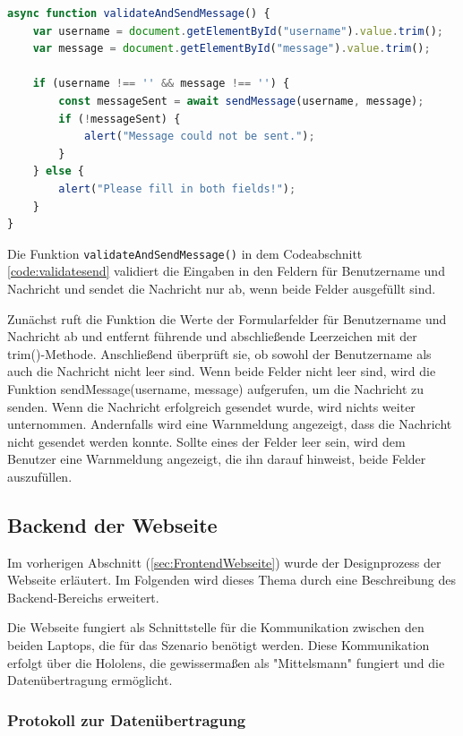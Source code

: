 \begin{itemize}
\begin{lstlisting}[language=JavaScript, caption={Javascript | Validierung und Senden der Message}, label=code:validatesend]
async function validateAndSendMessage() {
    var username = document.getElementById("username").value.trim();
    var message = document.getElementById("message").value.trim();

    if (username !== '' && message !== '') {
        const messageSent = await sendMessage(username, message);
        if (!messageSent) {
            alert("Message could not be sent.");
        }
    } else {
        alert("Please fill in both fields!");
    }
}
\end{lstlisting}
Die Funktion \texttt{validateAndSendMessage()} in dem Codeabschnitt \ref{code:validatesend} validiert die Eingaben in den Feldern für Benutzername und Nachricht und sendet die Nachricht nur ab, wenn beide Felder ausgefüllt sind.

Zunächst ruft die Funktion die Werte der Formularfelder für Benutzername und Nachricht ab und entfernt führende und abschließende Leerzeichen mit der trim()-Methode. Anschließend überprüft sie, ob sowohl der Benutzername als auch die Nachricht nicht leer sind. Wenn beide Felder nicht leer sind, wird die Funktion sendMessage(username, message) aufgerufen, um die Nachricht zu senden. Wenn die Nachricht erfolgreich gesendet wurde, wird nichts weiter unternommen. Andernfalls wird eine Warnmeldung angezeigt, dass die Nachricht nicht gesendet werden konnte. Sollte eines der Felder leer sein, wird dem Benutzer eine Warnmeldung angezeigt, die ihn darauf hinweist, beide Felder auszufüllen.

\subsection{\label{sec:webBackend}Backend der Webseite}

Im vorherigen Abschnitt (\ref{sec:FrontendWebseite}) wurde der Designprozess der Webseite erläutert. Im Folgenden wird dieses Thema durch eine Beschreibung des Backend-Bereichs erweitert.

Die Webseite fungiert als Schnittstelle für die Kommunikation zwischen den beiden Laptops, die für das Szenario benötigt werden. Diese Kommunikation erfolgt über die Hololens, die gewissermaßen als "Mittelsmann" fungiert und die Datenübertragung ermöglicht.
\subsubsection{Protokoll zur Datenübertragung}


\end{itemize}
